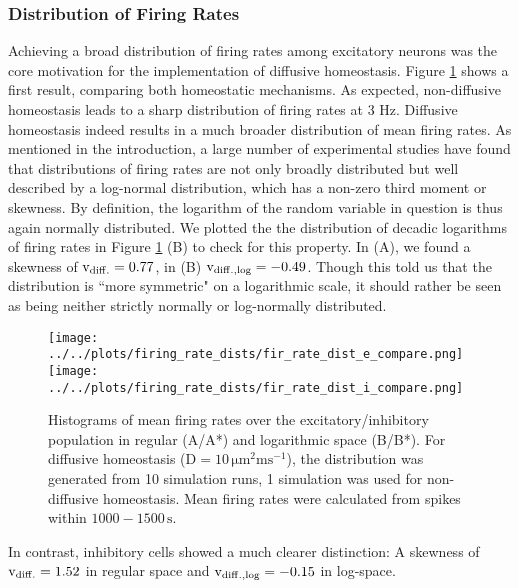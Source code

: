 \documentclass[10pt,a4paper]{article}
\begin{document}
\subsubsection{Distribution of Firing Rates}\label{Fir_Dist_Section}
Achieving a broad distribution of firing rates among excitatory neurons was the core motivation for the implementation of diffusive homeostasis. Figure \ref{Fir_Rate_Dist_Compare} shows a first result, comparing both homeostatic mechanisms. As expected, non-diffusive homeostasis leads to a sharp distribution of firing rates at 3 Hz. Diffusive homeostasis indeed results in a much broader distribution of mean firing rates. As mentioned in the introduction, a large number of experimental studies have found that distributions of firing rates are not only broadly distributed but well described by a log-normal distribution, which has a non-zero third moment or skewness. By definition, the logarithm of the random variable in question is thus again normally distributed. We plotted the the distribution of decadic logarithms of firing rates in Figure \ref{Fir_Rate_Dist_Compare} (B) to check for this property. In (A), we found a skewness of $\mathrm{v_{\rm diff.} = 0.77}$, in (B) $\mathrm{v_{\rm diff.,log} = -0.49}$. Though this told us that the distribution is ``more symmetric" on a logarithmic scale, it should rather be seen as being neither strictly normally or log-normally distributed.  
\begin{figure}
\texttt{[image: ../../plots/firing\_rate\_dists/fir\_rate\_dist\_e\_compare.png]}
\texttt{[image: ../../plots/firing\_rate\_dists/fir\_rate\_dist\_i\_compare.png]}
\caption{Histograms of mean firing rates over the excitatory/inhibitory population in regular (A/A*) and logarithmic space (B/B*). For diffusive homeostasis ($\mathrm{D=10\, \mu m^2 ms^{-1}}$), the distribution was generated from 10 simulation runs, 1 simulation was used for non-diffusive homeostasis. Mean firing rates were calculated from spikes within $\mathrm{1000-1500\,s}$.}
\label{Fir_Rate_Dist_Compare}
\end{figure}
In contrast, inhibitory cells showed a much clearer distinction: A skewness of $\mathrm{v_{\rm diff.} = 1.52}$ in regular space and $\mathrm{v_{\rm diff.,log} = -0.15}$ in log-space.
\end{document}
